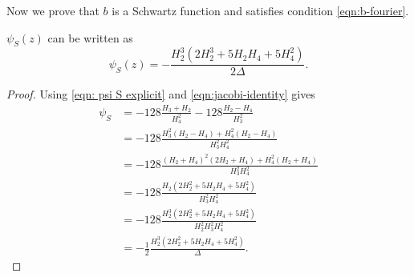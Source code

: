 Now we prove that $b$ is a Schwartz function and satisfies condition \eqref{eqn:b-fourier}.

\begin{lemma}\label{lemma:psiS-new}
$\psi_S(z)$ can be written as
\begin{equation}\label{eqn:psiS-new}
    \psi_S(z) = -\frac{H_2^3 (2 H_2^3 + 5 H_2 H_4 + 5 H_4^2)}{2 \Delta}.
\end{equation}
\end{lemma}
\begin{proof}
Using \eqref{eqn: psi S explicit} and \eqref{eqn:jacobi-identity} gives
\begin{align}
    \psi_S &= -128 \frac{H_3 + H_2}{H_4^2} - 128 \frac{H_2 - H_4}{H_3^2} \\
    &= -128 \frac{H_3^2 (H_2 - H_4) + H_4^2 (H_2 - H_4)}{H_3^2 H_4^2} \\
    &= -128 \frac{(H_2 + H_4)^2 (2H_2 + H_4) + H_4^2(H_2 + H_4)}{H_3^2 H_4^2} \\
    &= -128 \frac{H_2 (2H_2^2 + 5 H_2 H_4 + 5 H_4^2)}{H_3^2 H_4^2} \\
    &= -128 \frac{H_2^3 (2H_2^2 + 5 H_2 H_4 + 5 H_4^2)}{H_2^2 H_3^2 H_4^2} \\
    &= - \frac{1}{2} \frac{H_2^3 (2H_2^2 + 5 H_2 H_4 + 5 H_4^2)}{\Delta}.
\end{align}
\end{proof}

